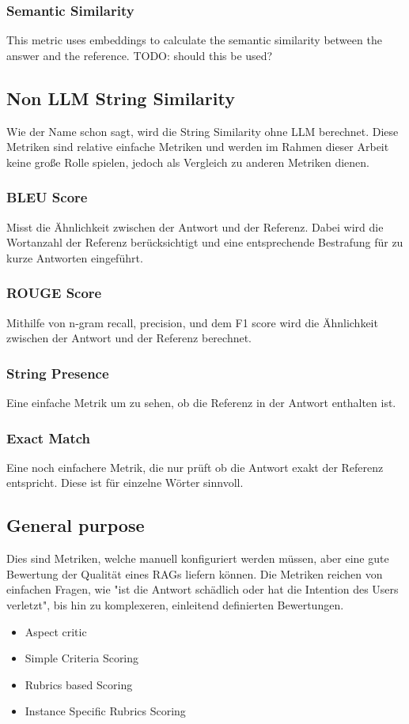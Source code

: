 \subsubsection{Semantic Similarity}
This metric uses embeddings to calculate the semantic similarity between the answer and the reference. TODO: should this be used?

\subsection{Non LLM String Similarity}
Wie der Name schon sagt, wird die String Similarity ohne LLM berechnet. Diese Metriken sind relative einfache Metriken und werden im Rahmen dieser Arbeit keine große Rolle spielen, jedoch als Vergleich zu anderen Metriken dienen.
\subsubsection{BLEU Score}
Misst die Ähnlichkeit zwischen der Antwort und der Referenz. Dabei wird die Wortanzahl der Referenz berücksichtigt und eine entsprechende Bestrafung für zu kurze Antworten eingeführt.
\subsubsection{ROUGE Score}
Mithilfe von n-gram recall, precision, und dem F1 score wird die Ähnlichkeit zwischen der Antwort und der Referenz berechnet.
\subsubsection{String Presence}
Eine einfache Metrik um zu sehen, ob die Referenz in der Antwort enthalten ist.
\subsubsection{Exact Match}
Eine noch einfachere Metrik, die nur prüft ob die Antwort exakt der Referenz entspricht. Diese ist für einzelne Wörter sinnvoll.

\subsection{General purpose}
Dies sind Metriken, welche manuell konfiguriert werden müssen, aber eine gute Bewertung der Qualität eines RAGs liefern können.
Die Metriken reichen von einfachen Fragen, wie "ist die Antwort schädlich oder hat die Intention des Users verletzt", bis hin zu komplexeren, einleitend definierten Bewertungen.
\begin{itemize}
    \item Aspect critic
    \item Simple Criteria Scoring
    \item Rubrics based Scoring
    \item Instance Specific Rubrics Scoring
  \end{itemize}

